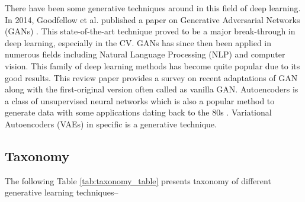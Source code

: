 \documentclass[conference]{IEEEtran}
\begin{document}
There have been some generative techniques around in this field of deep learning. In 2014, Goodfellow et al. published a paper on Generative Adversarial Networks (GANs) \cite{b1}. This state-of-the-art technique proved to be a major break-through in deep learning, especially in the CV. GANs has since then been applied in numerous fields including Natural Language Processing (NLP) and computer vision. This family of deep learning methods has become quite popular due to its good results. This review paper provides a survey on recent adaptations of GAN along with the first-original version often called as vanilla GAN. Autoencoders is a class of unsupervised neural networks which is also a popular method to generate data with some applications dating back to the 80s \cite{b2, b3}. Variational Autoencoders (VAEs) in specific is a generative technique.


\subsection{Taxonomy}
The following Table \ref{tab:taxonomy_table} presents taxonomy of different generative learning techniques--
\end{document}
